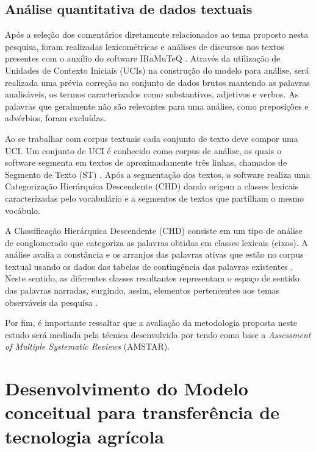 \subsection{Análise quantitativa de dados textuais}

Após a seleção dos comentários diretamente relacionados ao tema proposto nesta pesquisa, foram realizadas lexicométricas e análises de discursos nos textos presentes com o auxílio do software IRaMuTeQ \cite{conde_lexicometria_2015,da_silva_cezar_panorama_2018}. Através da utilização de Unidades de Contexto Iniciais (UCIs) na construção do modelo para análise, será realizada uma prévia correção no conjunto de dados brutos mantendo as palavras analisáveis, os termos caracterizados como substantivos, adjetivos e verbos. As palavras que geralmente não são relevantes para uma análise, como preposições e advérbios, foram excluídas.

Ao se trabalhar com corpus textuais cada conjunto de texto deve compor uma UCI. Um conjunto de UCI é conhecido como corpus de análise, os quais o software segmenta em textos de aproximadamente três linhas, chamados de Segmento de Texto (ST) \cite{fernandes_avaliacao_2018}. Após a segmentação dos textos, o software realiza uma Categorização Hierárquica Descendente (CHD) dando origem a classes lexicais caracterizadas pelo vocabulário e a segmentos de textos que partilham o mesmo vocábulo.

A Classificação Hierárquica Descendente (CHD) consiste em um tipo de análise de conglomerado que categoriza as palavras obtidas em classes lexicais (eixos). A análise avalia a constância e os arranjos das palavras ativas que estão no corpus textual usando os dados das tabelas de contingência das palavras existentes \cite{carvalho_utilizacao_2020,mendes_mapping_2019}. Neste sentido, as diferentes classes resultantes representam o espaço de sentido das palavras narradas, surgindo, assim, elementos pertencentes aos temas observáveis da pesquisa \cite{gavasso_revisao_2016}. 

Por fim, é importante ressaltar que a avaliação da metodologia proposta neste estudo será mediada pela técnica desenvolvida por  tendo como base a \textit{Assessment of Multiple Systematic Reviews} (AMSTAR).


\section{Desenvolvimento do Modelo conceitual para transferência de tecnologia agrícola}


